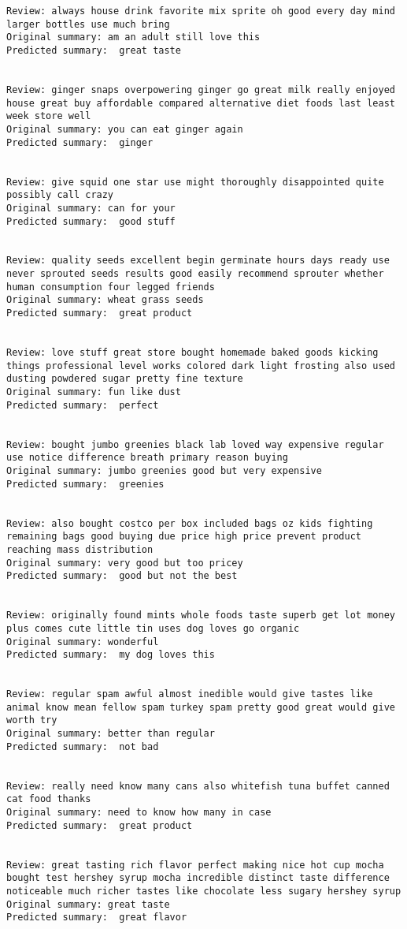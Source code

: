 \documentclass[11pt]{article}
\begin{document}
\begin{Verbatim}[commandchars=\\\{\}]
Review: always house drink favorite mix sprite oh good every day mind larger bottles use much bring 
Original summary: am an adult still love this 
Predicted summary:  great taste


Review: ginger snaps overpowering ginger go great milk really enjoyed house great buy affordable compared alternative diet foods last least week store well 
Original summary: you can eat ginger again 
Predicted summary:  ginger


Review: give squid one star use might thoroughly disappointed quite possibly call crazy 
Original summary: can for your 
Predicted summary:  good stuff


Review: quality seeds excellent begin germinate hours days ready use never sprouted seeds results good easily recommend sprouter whether human consumption four legged friends 
Original summary: wheat grass seeds 
Predicted summary:  great product


Review: love stuff great store bought homemade baked goods kicking things professional level works colored dark light frosting also used dusting powdered sugar pretty fine texture 
Original summary: fun like dust 
Predicted summary:  perfect


Review: bought jumbo greenies black lab loved way expensive regular use notice difference breath primary reason buying 
Original summary: jumbo greenies good but very expensive 
Predicted summary:  greenies


Review: also bought costco per box included bags oz kids fighting remaining bags good buying due price high price prevent product reaching mass distribution 
Original summary: very good but too pricey 
Predicted summary:  good but not the best


Review: originally found mints whole foods taste superb get lot money plus comes cute little tin uses dog loves go organic 
Original summary: wonderful 
Predicted summary:  my dog loves this


Review: regular spam awful almost inedible would give tastes like animal know mean fellow spam turkey spam pretty good great would give worth try 
Original summary: better than regular 
Predicted summary:  not bad


Review: really need know many cans also whitefish tuna buffet canned cat food thanks 
Original summary: need to know how many in case 
Predicted summary:  great product


Review: great tasting rich flavor perfect making nice hot cup mocha bought test hershey syrup mocha incredible distinct taste difference noticeable much richer tastes like chocolate less sugary hershey syrup 
Original summary: great taste 
Predicted summary:  great flavor



\end{Verbatim}
\end{document}

